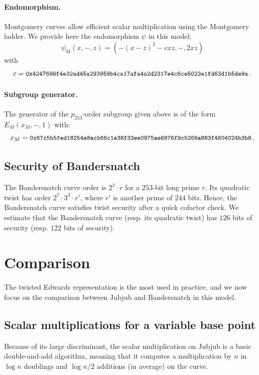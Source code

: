 \documentclass[version=preprint]{iacrcc}
\newcommand{\ZZ}[1]{\color{cyan}#1\color{black}}
\begin{document}
\paragraph{Endomorphism.}
Montgomery curves allow efficient scalar multiplication using the
Montgomery ladder. We provide here the endomorphism $\psi$ in this
model:
$$\psi_\text{M}(x,-,z) = (-(x-z)^2 - cxz, -, 2xz)$$
with
$$c = \text{{\small {\tt 0x4247698f4e32ad45a293959b4ca17afa4a2d2317e4c6ce5023e1fd63d1b5de9a.}}}$$

\paragraph{Subgroup generator.}
The generator of the $p_{253}$-order subgroup given above is of the
form $E_M(x_M,-,1)$ with:
$$x_M = \text{{\small{\tt 0x67c5b5fed18254e8acb66c1e38f33ee0975ae6876f9c5266a883f4604024b3b8.}}}$$

\subsection{Security of Bandersnatch}

The Bandersnatch curve order is $2^2\cdot r$ for a $253$-bit long
prime $r$.
Its quadratic twist has order
$2^7 \cdot 3^3 \cdot r'$, where $r'$ is another prime of $244$ bits.
Hence, the Bandersnatch curve satisfies twist security after a quick cofactor
check.
We estimate that the Bandersnatch curve (resp. its quadratic twist)
has $126$ bits of security (resp. $122$ bits of security).


\section{Comparison}\label{sec:comparison}

The twisted Edwards representation is the most used in practice, and we now focus on the comparison between Jubjub and Bandersnatch in this model.

\subsection{Scalar multiplications for a variable base point}
Because of its large discriminant, the scalar multiplication on Jubjub
is a basic double-and-add algorithm, meaning that it computes a
multiplication by $n$ in $\log n$ doublings and $\log n/2$
additions (in average) on the curve. 
\end{document}
